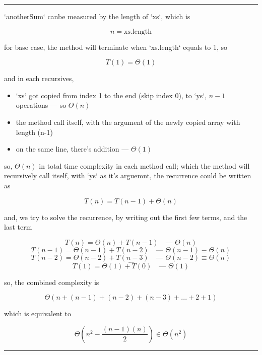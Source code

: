 \documentclass{article}
\theoremstyle{remark}
\begin{document}
\begin{enumerate*}
    \medskip
    \begin{center}
    \rule{0.3\linewidth}{0.2pt}
    \end{center}
    \medskip

    \item `anotherSum` canbe measured by the length of `xs`, which is

        \[\boxed{n = \text{xs.length}}\]

        for base case, the method will terminate when `xs.length` equals to 1, so

        \[T(1) = \Theta(1)\]
    
        and in each recursives,

        \begin{itemize}
            \item `xs` got copied from index 1 to the end (skip index 0), to `ys`, $n-1$ operations --- so $\Theta(n)$
            \item the method call itself, with the argument of the newly copied array with length (n-1)
            \item on the same line, there's addition --- $\Theta(1)$
        \end{itemize}

        so, $\Theta(n)$ in total time complexity in each method call; which the method will recursively call itself, with `ys` as it's arguemnt, the recurrence could be written as

        \[\boxed{T(n) = T(n-1) + \Theta(n)}\]

        and, we try to solve the recurrence, by writing out the first few terms, and the last term

        \[T(n) = \Theta(n) + T(n-1) \quad \text{--- } \Theta(n)\]
        \[T(n-1) = \Theta(n-1) + T(n-2) \quad \text{--- } \Theta(n-1) \equiv \Theta(n)\]
        \[T(n-2) = \Theta(n-2) + T(n-3) \quad \text{--- } \Theta(n-2) \equiv \Theta(n)\]
        \[...\]
        \[T(1) = \Theta(1) + T(0) \quad \text{--- } \Theta(1)\]

        so, the combined complexity is

        \[\Theta(n + (n-1) + (n-2) + (n-3) + ... + 2 + 1)\]

        which is equivalent to

        \[\Theta(n^2 - \frac{(n-1)(n)}{2}) \in \boxed{\Theta(n^2)}\]

    \medskip
    \begin{center}
    \rule{0.3\linewidth}{0.2pt}
    \end{center}
    \medskip


\end{enumerate*}
\end{document}
